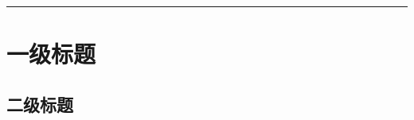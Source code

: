 \documentclass[10pt]{article}
\begin{document}
\tableofcontents
\vspace{2mm}\hrule\vspace{2mm}
\section{一级标题}
\subsection{二级标题}
\end{document}
